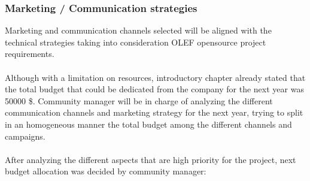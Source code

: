 \documentclass[11pt]{article}
\begin{document}
\subsubsection{Marketing / Communication strategies}
Marketing and communication channels selected will be aligned with the technical strategies taking into consideration OLEF opensource project requirements.\\
\\
Although with a limitation on resources, introductory chapter already stated that the total budget that could be dedicated from the company for the next year was 50000 \$. Community manager will be in charge of analyzing the different communication channels and marketing strategy for the next year, trying to split in an homogeneous manner the total budget among the different channels and campaigns.\\
\\
After analyzing the different aspects that are high priority for the project, next budget allocation was decided by community manager:
\end{document}
